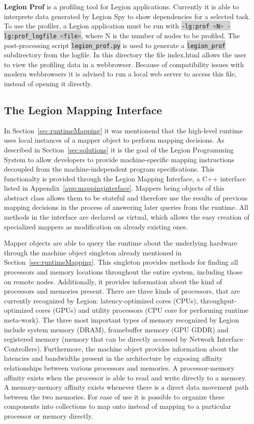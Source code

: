 \documentclass{article}      %
\newcommand{\inlinecode}[2]{\colorbox{lightgray}{\lstinline[language=#1]$#2$}}
\begin{document}
\textbf{Legion Prof} is a profiling tool for Legion applications. Currently it is able to interprete data generated by Legion Spy to show dependencies for a selected task. To use the profiler, a Legion application must be run with \inlinecode{Bash}{-lg:prof <N> -lg:prof_logfile <file>}, where N is the number of nodes to be profiled. The post-processing script \inlinecode{Bash}{legion_prof.py} is used to generate a \inlinecode{Bash}{legion_prof} subdirectory from the logfile.
In this directory the file index.html allows the user to view the profiling data in a webbrowser. Because of compatibility issues with modern webbrowsers it is advised to run a local web server to access this file, instead of opening it directly.


\subsection{The Legion Mapping Interface}\label{sec:mappinginterface}
In Section~\ref{sec:runtimeMapping} it was mentionend that the high-level runtime uses local instances of a mapper object to perform mapping decisions. As described in Section~\ref{sec:solutions} it is the goal of the Legion Programming System to allow developers to provide machine-specific mapping instructions decoupled from the machine-independent program specifications. This functionalty is provided through the Legion Mapping Interface, a C++ interface listed in Appendix~\ref{app:mappinginterface}. Mappers being objects of this abstract class allows them to be stateful and therefore use the results of previous mapping decisions in the process of answering later queries from the runtime. All methods in the interface are declared as virtual, which allows the easy creation of specialized mappers as modification on already existing ones.

Mapper objects are able to query the runtime about the underlying hardware through the machine object singleton already mentioned in Section~\ref{sec:runtimeMapping}. This singleton provides methods for finding all processors and memory locations throughout the entire system, including those on remote nodes. Additionally, it provides information about the kind of processors and memories present. There are three kinds of processors, that are currently recognized by Legion: latency-optimized cores (CPUs), throughput-optimized cores (GPUs) and utility processors (CPU core for performing runtime meta-work). The three most important types of memory recognized by Legion include system memory (DRAM), framebuffer memory (GPU GDDR) and registered memory (memory that can be directly accessed by Network Interface Controllers). Furthermore, the machine object provides information about the latencies and bandwidths present in the architecture by exposing affinity relationships between various processors and memories. A processor-memory affinity exists when the processor is able to read and write directly to a memory. A memory-memory affinity exists whenever there is a direct data movement path between the two memories. For ease of use it is possible to organize these components into collections to map onto instead of mapping to a particular processor or memory directly. 
\end{document}

